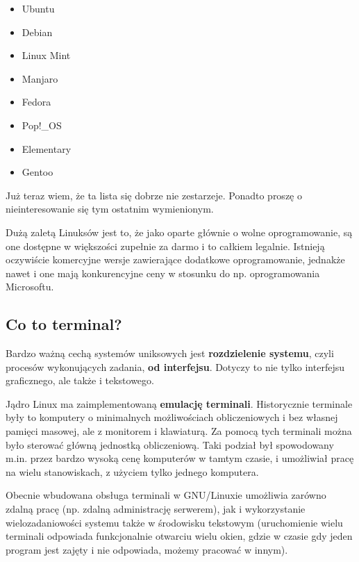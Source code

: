 \documentclass[12pt]{article}
\begin{document}
\begin{itemize}
    \item Ubuntu
    \item Debian
    \item Linux Mint
    \item Manjaro
    \item Fedora
    \item Pop!\_OS
    \item Elementary
    \item Gentoo
\end{itemize}

Już teraz wiem, że ta lista się dobrze nie zestarzeje. Ponadto proszę o nieinteresowanie się tym ostatnim wymienionym.

Dużą zaletą Linuksów jest to, że jako oparte głównie o wolne oprogramowanie, są one dostępne w większości zupełnie za darmo i to całkiem legalnie. Istnieją oczywiście komercyjne wersje zawierające dodatkowe oprogramowanie, jednakże nawet i one mają konkurencyjne ceny w stosunku do np. oprogramowania Microsoftu. 

\subsection{Co to terminal?}

Bardzo ważną cechą systemów uniksowych jest \textbf{rozdzielenie systemu}, czyli procesów wykonujących zadania, \textbf{od interfejsu}. Dotyczy to nie tylko interfejsu graficznego, ale także i tekstowego.

Jądro Linux ma zaimplementowaną \textbf{emulację terminali}. Historycznie terminale były to komputery o minimalnych możliwościach obliczeniowych i bez własnej pamięci masowej, ale z monitorem i klawiaturą. Za pomocą tych terminali można było sterować główną jednostką obliczeniową. Taki podział był spowodowany m.in. przez bardzo wysoką cenę komputerów w tamtym czasie, i umożliwiał pracę na wielu stanowiskach, z użyciem tylko jednego komputera.

Obecnie wbudowana obsługa terminali w GNU/Linuxie umożliwia zarówno zdalną pracę (np. zdalną administrację serwerem), jak i wykorzystanie wielozadaniowości systemu także w środowisku tekstowym (uruchomienie wielu terminali odpowiada funkcjonalnie otwarciu wielu okien, gdzie w czasie gdy jeden program jest zajęty i nie odpowiada, możemy pracować w innym).
\end{document}
